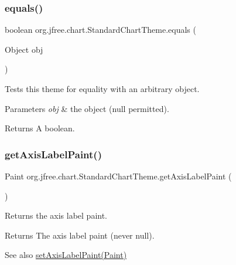 \subsubsection{\texorpdfstring{equals()}{equals()}}
{\footnotesize\ttfamily boolean org.\+jfree.\+chart.\+Standard\+Chart\+Theme.\+equals (\begin{DoxyParamCaption}\item[{Object}]{obj }\end{DoxyParamCaption})}

Tests this theme for equality with an arbitrary object.


\begin{DoxyParams}{Parameters}
{\em obj} & the object ({\ttfamily null} permitted).\\
\hline
\end{DoxyParams}
\begin{DoxyReturn}{Returns}
A boolean. 
\end{DoxyReturn}
\mbox{\label{classorg_1_1jfree_1_1chart_1_1_standard_chart_theme_a1aa86cdb01a8291e444a919d1419f40e}} 
\subsubsection{\texorpdfstring{get\+Axis\+Label\+Paint()}{getAxisLabelPaint()}}
{\footnotesize\ttfamily Paint org.\+jfree.\+chart.\+Standard\+Chart\+Theme.\+get\+Axis\+Label\+Paint (\begin{DoxyParamCaption}{ }\end{DoxyParamCaption})}

Returns the axis label paint.

\begin{DoxyReturn}{Returns}
The axis label paint (never {\ttfamily null}).
\end{DoxyReturn}
\begin{DoxySeeAlso}{See also}
\mbox{\hyperlink{classorg_1_1jfree_1_1chart_1_1_standard_chart_theme_a905484deb0fc0cac980df62d3265698b}{set\+Axis\+Label\+Paint(\+Paint)}} 
\end{DoxySeeAlso}
\mbox{\label{classorg_1_1jfree_1_1chart_1_1_standard_chart_theme_a29b114f43a2036250c24fc8544e95282}} 
